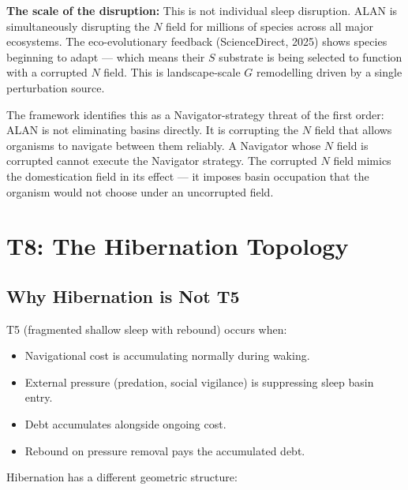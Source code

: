 \documentclass[10pt, a4paper]{article}
\begin{document}
\textbf{The scale of the disruption:}
This is not individual sleep disruption.
ALAN is simultaneously disrupting the
$N$ field for millions of species
across all major ecosystems. The
eco-evolutionary feedback (ScienceDirect,
2025) shows species beginning to adapt
--- which means their $S$ substrate
is being selected to function with
a corrupted $N$ field. This is
landscape-scale $G$ remodelling
driven by a single perturbation source.

The framework identifies this as
a Navigator-strategy threat of the
first order: ALAN is not eliminating
basins directly. It is corrupting the
$N$ field that allows organisms to
navigate between them reliably. A
Navigator whose $N$ field is corrupted
cannot execute the Navigator strategy.
The corrupted $N$ field mimics the
domestication field in its effect ---
it imposes basin occupation that the
organism would not choose under an
uncorrupted field.

\section{T8: The Hibernation Topology}
\label{sec:t8}

\subsection{Why Hibernation is Not T5}

T5 (fragmented shallow sleep with
rebound) occurs when:
\begin{itemize}[itemsep=0.2em]
  \item Navigational cost is accumulating
    normally during waking.
  \item External pressure (predation,
    social vigilance) is suppressing
    sleep basin entry.
  \item Debt accumulates alongside
    ongoing cost.
  \item Rebound on pressure removal
    pays the accumulated debt.
\end{itemize}

Hibernation has a different geometric
structure:
\end{document}
